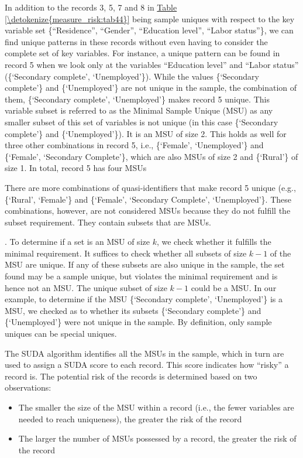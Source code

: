 \documentclass[letterpaper,10pt,english]{sphinxmanual}
\begin{document}
In addition to the records 3, 5, 7 and 8 in \hyperref[\detokenize{measure_risk:tab44}]{Table \ref{\detokenize{measure_risk:tab44}}} being sample
uniques with respect to the key variable set \{“Residence”, “Gender”,
“Education level”, “Labor status”\}, we can find unique patterns in these
records without even having to consider the complete set of key
variables. For instance, a unique pattern can be found in record 5 when
we look only at the variables “Education level” and “Labor status”
(\{‘Secondary complete’, ‘Unemployed’\}). While the values \{‘Secondary
complete’\} and \{‘Unemployed’\} are not unique in the sample, the
combination of them, \{‘Secondary complete’, ‘Unemployed’\} makes record 5
unique. This variable subset is referred to as the Minimal Sample Unique
(MSU) as any smaller subset of this set of variables is not unique (in
this case \{‘Secondary complete’\} and \{‘Unemployed’\}). It is an MSU of
size 2. This holds as well
for three other combinations in record 5, i.e., \{‘Female’, ‘Unemployed’\}
and \{‘Female’, ‘Secondary Complete’\}, which are also MSUs of size 2 and
\{‘Rural’\} of size 1. In total, record 5 has four
MSUs %
\begin{footnote}[11]\sphinxAtStartFootnote
There are more combinations of quasi-identifiers that make record 5
unique (e.g., \{‘Rural’, ‘Female’\} and \{‘Female’, ‘Secondary
Complete’, ‘Unemployed’\}. These combinations, however, are not
considered MSUs because they do not fulfill the  subset
requirement. They contain subsets that are MSUs.
%
\end{footnote}. To determine if a set is an MSU of size
\(k\), we check whether it fulfills the minimal requirement. It
suffices to check whether all subsets of size \(k-1\) of the MSU are
unique. If any of these subsets are also unique in the sample, the set
found may be a sample unique, but violates the minimal requirement and
is hence not an MSU. The unique subset of size \(k-1\) could be a
MSU. In our example, to determine if the MSU \{‘Secondary complete’,
‘Unemployed’\} is a MSU, we checked as to whether its subsets \{‘Secondary
complete’\} and \{‘Unemployed’\} were not unique in the sample. By
definition, only sample uniques can be special uniques.

The SUDA algorithm identifies all the MSUs in the sample, which in turn
are used to assign a SUDA score to each record. This score indicates how
“risky” a record is. The potential risk of the records is determined
based on two observations:
\begin{itemize}
\item {} 
The smaller the size of the MSU within a record (i.e., the fewer
variables are needed to reach uniqueness), the greater the risk of
the record

\item {} 
The larger the number of MSUs possessed by a record, the greater the
risk of the record

\end{itemize}
\end{document}
